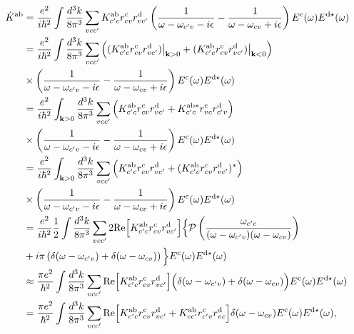 \documentclass[floatfix,prb,aps,superscriptaddress,11pt]{revtex4}
\begin{document}
\begin{align}\label{5.e}
\dot K^{\mathrm{a}\mathrm{b}}
&=
\frac{e^2}{i\hbar^2}
\int\frac{d^3k}{8\pi^3}
\sum_{vcc'}
K^{\mathrm{a}\mathrm{b}}_{c'c}
r^{\mathrm{c}}_{cv}r^{\mathrm{d}}_{vc'}
\left(
\frac{1}{\omega-\omega_{c'v}-i\epsilon}
-
\frac{1}
{\omega-\omega_{cv}+i\epsilon}
\right) 
E^{\mathrm{c}}(\omega)E^{\mathrm{d}\star}(\omega) 
\nonumber\\
&=
\frac{e^2}{i\hbar^2}
\int\frac{d^3k}{8\pi^3}
\sum_{vcc'}
\Big(
(K^{\mathrm{a}\mathrm{b}}_{c'c}
r^{\mathrm{c}}_{cv}r^{\mathrm{d}}_{vc'}) \big |_{\mathbf{k}>0}
+
(K^{\mathrm{a}\mathrm{b}}_{c'c}
r^{\mathrm{c}}_{cv}r^{\mathrm{d}}_{vc'}) \big |_{\mathbf{k}<0}
\Big) 
\nonumber\\
&\times 
\left(
\frac{1}{\omega-\omega_{c'v}-i\epsilon}
-
\frac{1}
{\omega-\omega_{cv}+i\epsilon}
\right) 
E^{\mathrm{c}}(\omega)E^{\mathrm{d}\star}(\omega) 
\nonumber\\
&=
\frac{e^2}{i\hbar^2}
\int_{\mathbf{k}>0}\frac{d^3k}{8\pi^3}
\sum_{vcc'}
\Big(
K^{\mathrm{a}\mathrm{b}}_{c'c}
r^{\mathrm{c}}_{cv}r^{\mathrm{d}}_{vc'}
+
K^{\mathrm{a}\mathrm{b}*}_{c'c}
r^{\mathrm{c}}_{vc}r^{\mathrm{d}}_{c'v}
\Big) 
\nonumber\\
&\times 
\left(
\frac{1}{\omega-\omega_{c'v}-i\epsilon}
-
\frac{1}
{\omega-\omega_{cv}+i\epsilon}
\right) 
E^{\mathrm{c}}(\omega)E^{\mathrm{d}\star}(\omega) 
\nonumber\\
&=
\frac{e^2}{i\hbar^2}
\int_{\mathbf{k}>0}\frac{d^3k}{8\pi^3}
\sum_{vcc'}
\Big(
K^{\mathrm{a}\mathrm{b}}_{c'c}
r^{\mathrm{c}}_{cv}r^{\mathrm{d}}_{vc'}
+
(K^{\mathrm{a}\mathrm{b}}_{c'c}
r^{\mathrm{c}}_{cv}r^{\mathrm{d}}_{vc'})^*
\Big) 
\nonumber\\
&\times 
\left(
\frac{1}{\omega-\omega_{c'v}-i\epsilon}
-
\frac{1}
{\omega-\omega_{cv}+i\epsilon}
\right) 
E^{\mathrm{c}}(\omega)E^{\mathrm{d}\star}(\omega) 
\nonumber\\
&=
\frac{e^2}{i\hbar^2}
\frac{1}{2}
\int\frac{d^3k}{8\pi^3}
\sum_{vcc'}
2\mathrm{Re}\Big[
K^{\mathrm{a}\mathrm{b}}_{c'c}
r^{\mathrm{c}}_{cv}r^{\mathrm{d}}_{vc'}
\Big]
\Big\{
{\cal P}\left(
\frac{\omega_{c'c}}{(\omega-\omega_{c'v})(\omega-\omega_{cv})}
\right) 
\nonumber\\
&+
i\pi 
\left(
\delta(\omega-\omega_{c'v}) 
+
\delta(\omega-\omega_{cv}) 
\right) 
\Big\}
E^{\mathrm{c}}(\omega)E^{\mathrm{d}\star}(\omega) 
\nonumber\\
&\approx 
\frac{\pi e^2}{\hbar^2}
\int\frac{d^3k}{8\pi^3}
\sum_{vcc'}
\mathrm{Re}\Big[
K^{\mathrm{a}\mathrm{b}}_{c'c}
r^{\mathrm{c}}_{cv}r^{\mathrm{d}}_{vc'}
\Big]
\Big(
\delta(\omega-\omega_{c'v}) 
+
\delta(\omega-\omega_{cv}) 
\Big) 
E^{\mathrm{c}}(\omega)E^{\mathrm{d}\star}(\omega) 
\nonumber\\
&=
\frac{\pi e^2}{\hbar^2}
\int\frac{d^3k}{8\pi^3}
\sum_{vcc'}
\mathrm{Re}
\Big[ 
K^{\mathrm{a}\mathrm{b}}_{c'c} 
r^{\mathrm{c}}_{cv}r^{\mathrm{d}}_{vc'}
+ 
K^{\mathrm{a}\mathrm{b}}_{cc'} 
r^{\mathrm{c}}_{c'v}r^{\mathrm{d}}_{vc}
\Big]
\delta(\omega-\omega_{cv})  
E^{\mathrm{c}}(\omega)E^{\mathrm{d}\star}(\omega) 
,
\end{align} 
\end{document}
